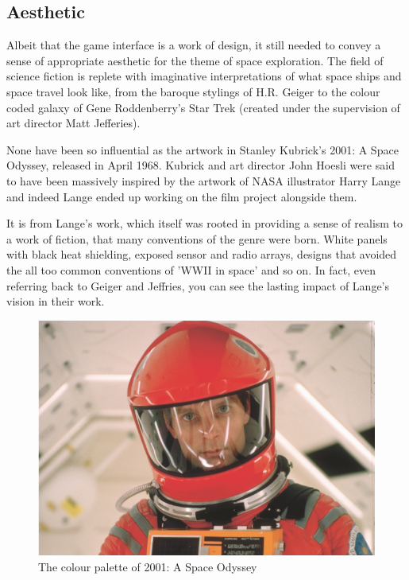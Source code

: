 \documentclass[twoside]{bhamthesis}
\begin{document}
\subsection{Aesthetic}

Albeit that the game interface is a work of design, it still needed to convey a sense of appropriate aesthetic for the theme of space exploration. The field of science fiction is replete with imaginative interpretations of what space ships and space travel look like, from the baroque stylings of H.R. Geiger to the colour coded galaxy of Gene Roddenberry's Star Trek (created under the supervision of art director Matt Jefferies).

None have been so influential as the artwork in Stanley Kubrick's 2001: A Space Odyssey, released in April 1968. Kubrick and art director John Hoesli were said to have been massively inspired by the artwork of  NASA illustrator Harry Lange \cite{sinclair_man_2016} and indeed Lange ended up working on the film project alongside them.

It is from Lange's work, which itself was rooted in providing a sense of realism to a work of fiction, that many conventions of the genre were born. White panels with black heat shielding, exposed sensor and radio arrays, designs that avoided the all too common conventions of 'WWII in space' and so on. In fact, even referring back to Geiger and Jeffries, you can see the lasting impact of Lange's vision in their work. 

\begin{figure}[h!]
  \includegraphics[width=\linewidth]{images/2001_palette.png}
  \caption{The colour palette of 2001: A Space Odyssey {\cite{sinclair_man_2016}}}
  \label{fig:2001_palette}
\end{figure}
\end{document}
